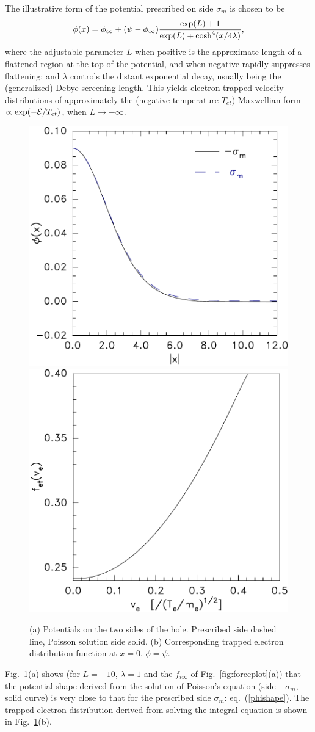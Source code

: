 \documentclass[12pt]{article}
\def\energy{{\cal E}}
\begin{document}
The illustrative form of the potential prescribed on side $\sigma_m$
is chosen to be
\begin{equation}\label{phishape}
  \phi(x)=\phi_\infty+(\psi-\phi_\infty){\exp(L)+1\over
  \exp(L)+\cosh^4(x/4\lambda)},
\end{equation}
where the adjustable parameter $L$ when positive is the approximate
length of a flattened region at the top of the potential, and when
negative rapidly suppresses flattening; and $\lambda$ controls the
distant exponential decay, usually being the (generalized) Debye
screening length. This yields electron trapped velocity distributions
of approximately the (negative temperature $T_{et}$) Maxwellian form
$\propto\exp(-\energy/T_{et})$, when $L\to-\infty$\cite{Hutchinson2017}.
\begin{figure}[htp]
  \includegraphics[width=0.48\hsize]{phiofmodx}
  \includegraphics[width=0.48\hsize]{ftrapped}
  \caption{(a) Potentials on the two sides of the hole. Prescribed
    side dashed line, Poisson solution side solid. (b) Corresponding trapped
    electron distribution function at $x=0$, $\phi=\psi$.}
  \label{fig:phiofmodx}
\end{figure}
Fig.\ \ref{fig:phiofmodx}(a) shows (for $L=-10$, $\lambda=1$ and the
$f_{i\infty}$ of Fig.\ \ref{fig:forceplot}(a)) that the potential
shape derived from the solution of Poisson's equation (side
$-\sigma_m$, solid curve) is very close to that for the prescribed
side $\sigma_m$: eq.\ (\ref{phishape}). The trapped electron
distribution derived from solving the integral equation is shown in
Fig.\ \ref{fig:phiofmodx}(b).
\end{document}
